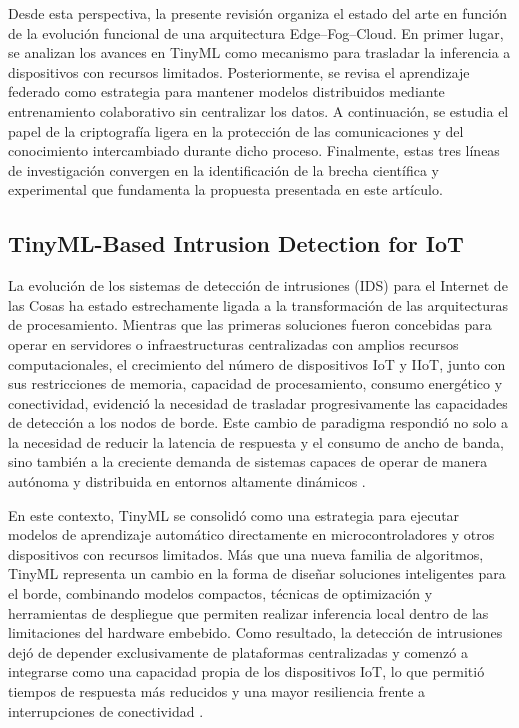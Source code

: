 \documentclass[journal,article,submit,moreauthors]{Definitions/mdpi}
\begin{document}
Desde esta perspectiva, la presente revisión organiza el estado del arte en función de la evolución funcional de una arquitectura Edge--Fog--Cloud. En primer lugar, se analizan los avances en TinyML como mecanismo para trasladar la inferencia a dispositivos con recursos limitados. Posteriormente, se revisa el aprendizaje federado como estrategia para mantener modelos distribuidos mediante entrenamiento colaborativo sin centralizar los datos. A continuación, se estudia el papel de la criptografía ligera en la protección de las comunicaciones y del conocimiento intercambiado durante dicho proceso. Finalmente, estas tres líneas de investigación convergen en la identificación de la brecha científica y experimental que fundamenta la propuesta presentada en este artículo.

\subsection{TinyML-Based Intrusion Detection for IoT}
La evolución de los sistemas de detección de intrusiones (IDS) para el Internet de las Cosas ha estado estrechamente ligada a la transformación de las arquitecturas de procesamiento. Mientras que las primeras soluciones fueron concebidas para operar en servidores o infraestructuras centralizadas con amplios recursos computacionales, el crecimiento del número de dispositivos IoT y IIoT, junto con sus restricciones de memoria, capacidad de procesamiento, consumo energético y conectividad, evidenció la necesidad de trasladar progresivamente las capacidades de detección a los nodos de borde. Este cambio de paradigma respondió no solo a la necesidad de reducir la latencia de respuesta y el consumo de ancho de banda, sino también a la creciente demanda de sistemas capaces de operar de manera autónoma y distribuida en entornos altamente dinámicos \cite{Ni2024,Amanullah2020,Bagaa2020,SaravanaBalaji2023}.
%

En este contexto, TinyML se consolidó como una estrategia para ejecutar modelos de aprendizaje automático directamente en microcontroladores y otros dispositivos con recursos limitados. Más que una nueva familia de algoritmos, TinyML representa un cambio en la forma de diseñar soluciones inteligentes para el borde, combinando modelos compactos, técnicas de optimización y herramientas de despliegue que permiten realizar inferencia local dentro de las limitaciones del hardware embebido. Como resultado, la detección de intrusiones dejó de depender exclusivamente de plataformas centralizadas y comenzó a integrarse como una capacidad propia de los dispositivos IoT, lo que permitió tiempos de respuesta más reducidos y una mayor resiliencia frente a interrupciones de conectividad \cite{Tekin2023,Amuthadevi2025,Dini2024,Heydari2024}.
\end{document}
